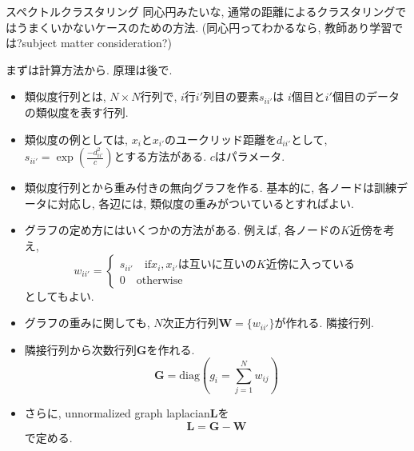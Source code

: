 \documentclass[dvipdfmx,8pt]{beamer}
\begin{document}
  \begin{frame}{スペクトルクラスタリング}
    同心円みたいな, 通常の距離によるクラスタリングではうまくいかないケースのための方法.
    (同心円ってわかるなら, 教師あり学習では?subject matter consideration?)

    まずは計算方法から. 原理は後で.
    \begin{itemize}
      \item 類似度行列とは, $N\times N$行列で, $i$行$i'$列目の要素$s_{ii'}$は
        $i$個目と$i'$個目のデータの類似度を表す行列.
      \item 類似度の例としては, $x_i$と$x_{i'}$のユークリッド距離を$d_{ii'}$として,
        $s_{ii'}=\exp(\frac{-d_{ii'}^2}{c})$とする方法がある. $c$はパラメータ.
      \item 類似度行列とから重み付きの無向グラフを作る.
        基本的に, 各ノードは訓練データに対応し, 各辺には, 類似度の重みがついているとすればよい.
      \item グラフの定め方にはいくつかの方法がある. 例えば, 各ノードの$K$近傍を考え,
        \[
          w_{ii'}=
          \begin{cases}
            s_{ii'} \quad \mbox{if} x_i, x_{i'}\mbox{は互いに互いの}K\mbox{近傍に入っている}\\
            0 \quad \mbox{otherwise}
          \end{cases}
        \]
        としてもよい.
      \item グラフの重みに関しても, $N$次正方行列$\textbf{W}=\{w_{ii'}\}$が作れる. 隣接行列.
      \item 隣接行列から次数行列$\textbf{G}$を作れる.
        \[
          \textbf{G}=\mathrm{diag}\left(g_i=\sum_{j=1}^Nw_{ij}\right)
        \]
    \item さらに, unnormalized graph laplacian$\textbf{L}$を
      \[
        \textbf{L}=\textbf{G}-\textbf{W}
      \]
      で定める.

    \end{itemize}
  \end{frame}
\end{document}
